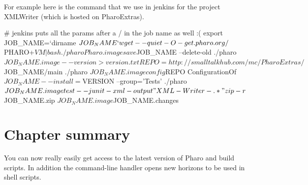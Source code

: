 \documentclass[a4paper,10pt,twoside]{book}
\begin{document}
For example here is the command that we use in jenkins for the project XMLWriter (which is hosted on PharoExtras). 

\begin{code}{}
# jenkins puts all the params after a / in the job name as well :(
export JOB_NAME=`dirname $JOB_NAME`

wget --quiet -O - get.pharo.org/$PHARO+$VM | bash

./pharo Pharo.image save $JOB_NAME --delete-old
./pharo $JOB_NAME.image --version > version.txt

REPO=http://smalltalkhub.com/mc/PharoExtras/$JOB_NAME/main
./pharo $JOB_NAME.image config $REPO ConfigurationOf$JOB_NAME --install=$VERSION --group='Tests'
./pharo $JOB_NAME.image test --junit-xml-output "XML-Writer-.*"

zip -r $JOB_NAME.zip $JOB_NAME.image $JOB_NAME.changes
\end{code}

\section{Chapter summary}
You can now really easily get access to the latest version of Pharo and build scripts. In addition the 
command-line handler opens new horizons to be used in shell scripts.

\ifx\wholebook\relax\else
   
   
\end{document}
